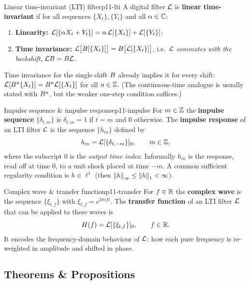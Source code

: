 \begin{definition}{Linear time-invariant (LTI) filter}{p11-lti}
A digital filter $\mathcal{L}$ is \textbf{linear time-invariant} if for all sequences
$\{X_t\},\{Y_t\}$ and all $\alpha\in\mathbb{C}$:
\begin{enumerate}
  \item \textbf{Linearity:}
        $\displaystyle \mathcal{L}[\{\alpha X_t+Y_t\}]=\alpha\,\mathcal{L}[\{X_t\}]+\mathcal{L}[\{Y_t\}]$;
  \item \textbf{Time invariance:}
        $\displaystyle \mathcal{L}\big[B[\{X_t\}]\big]=B\big[\mathcal{L}[\{X_t\}]\big]$,
        i.e.\ $\mathcal{L}$ \emph{commutes with the backshift}, $\mathcal{L}B=B\mathcal{L}$.
\end{enumerate}
Time invariance for the single shift $B$ already implies it for every shift:
$\mathcal{L}[B^u\{X_t\}]=B^u\mathcal{L}[\{X_t\}]$ for all $u\in\mathbb{Z}$. (The
continuous-time analogue is usually stated with $B^u$, but the weaker
one-step condition suffices.)
\end{definition}

\begin{definition}{Impulse sequence \& impulse response}{p11-impulse}
For $m\in\mathbb{Z}$ the \textbf{impulse sequence} $\{\delta_{t,m}\}$ is
$\delta_{t,m}=1$ if $t=m$ and $0$ otherwise. The \textbf{impulse response} of an
LTI filter $\mathcal{L}$ is the sequence $\{h_m\}$ defined by
\[
h_m=\mathcal{L}[\{\delta_{t,-m}\}]_0,\qquad m\in\mathbb{Z},
\]
where the subscript $0$ is the \emph{output time index}. Informally $h_m$ is the
response, read off at time $0$, to a unit shock placed at time $-m$. A common
sufficient regularity condition is $h\in\ell^1$
(then $\left\lVert h \right\rVert_\infty\le\left\lVert h \right\rVert_1<\infty$).
\end{definition}

\begin{definition}{Complex wave \& transfer function}{p11-transfer}
For $f\in\mathbb{R}$ the \textbf{complex wave} is the sequence
$\{\xi_{t,f}\}$ with $\xi_{t,f}=e^{2\pi i f t}$. The \textbf{transfer function}
of an LTI filter $\mathcal{L}$ that can be applied to these waves is
\[
H(f)=\mathcal{L}[\{\xi_{t,f}\}]_0,\qquad f\in\mathbb{R} .
\]
It encodes the frequency-domain behaviour of $\mathcal{L}$: how each pure frequency is
re-weighted in amplitude and shifted in phase.
\end{definition}

\subsection{Theorems \& Propositions}

